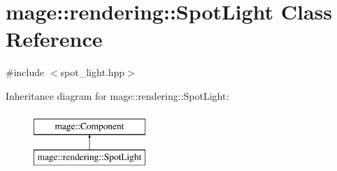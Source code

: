 \hypertarget{classmage_1_1rendering_1_1_spot_light}{}\section{mage\+:\+:rendering\+:\+:Spot\+Light Class Reference}
\label{classmage_1_1rendering_1_1_spot_light}


{\ttfamily \#include $<$spot\+\_\+light.\+hpp$>$}

Inheritance diagram for mage\+:\+:rendering\+:\+:Spot\+Light\+:\begin{figure}[H]
\begin{center}
\leavevmode
\includegraphics[height=2.000000cm]{classmage_1_1rendering_1_1_spot_light}
\end{center}
\end{figure}
